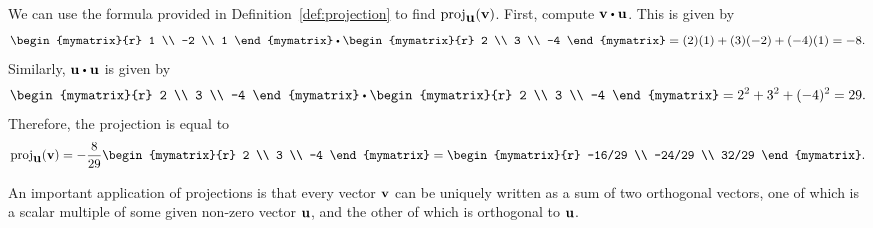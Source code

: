 \begin{solution}
  We can use the formula provided in Definition~\ref{def:projection}
  to find $\proj_{\vect{u}}(\vect{v})$.  First, compute
  $\vect{v} \dotprod \vect{u}$.  This is given by
  \begin{equation*}
    \begin{mymatrix}{r}
      1 \\
      -2 \\
      1
    \end{mymatrix}
    \dotprod
    \begin{mymatrix}{r}
      2 \\
      3 \\
      -4
    \end{mymatrix}
    = (2)(1) + (3)(-2) + (-4)(1)
    = -8.
   \end{equation*}
   Similarly, $\vect{u} \dotprod \vect{u}$ is given by
   \begin{equation*}
     \begin{mymatrix}{r}
       2 \\
       3 \\
       -4
     \end{mymatrix}
     \dotprod
     \begin{mymatrix}{r}
       2 \\
       3 \\
       -4
     \end{mymatrix}
     = 2^2 + 3^2 + (-4)^2
     = 29.
  \end{equation*}
  Therefore, the projection is equal to
  \begin{equation*}
    \proj_{\vect{u}}(\vect{v})
    =-\frac{8}{29}
        \begin{mymatrix}{r}
          2 \\
          3 \\
          -4
        \end{mymatrix}
    =
        \begin{mymatrix}{r}
          -16/29 \\
          -24/29 \\
          32/29
        \end{mymatrix}.
  \end{equation*}
\end{solution}

An important application of projections is that every vector
$\mbox{\bf v}$ can be uniquely written as a sum of two orthogonal vectors,
one of which is a scalar multiple of some given non-zero vector
$\mbox{\bf u}$, and the other of which is orthogonal to $\mbox{\bf u}$.

